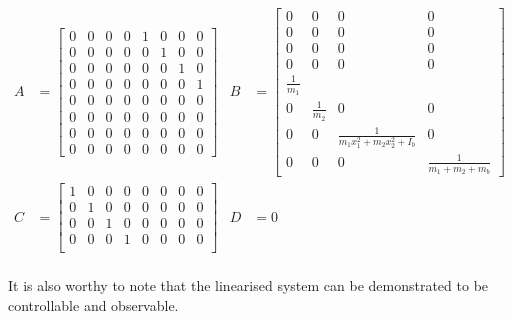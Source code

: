 \documentclass{UoNMCHA}
\numberwithin{equation}{section}
\begin{document}
\begin{align*}
A & = 
\begin{bmatrix}
0 & 0 & 0 & 0 & 1 & 0 & 0 & 0 \\
0 & 0 & 0 & 0 & 0 & 1 & 0 & 0 \\
0 & 0 & 0 & 0 & 0 & 0 & 1 & 0 \\
0 & 0 & 0 & 0 & 0 & 0 & 0 & 1 \\
0 & 0 & 0 & 0 & 0 & 0 & 0 & 0 \\
0 & 0 & 0 & 0 & 0 & 0 & 0 & 0 \\
0 & 0 & 0 & 0 & 0 & 0 & 0 & 0 \\
0 & 0 & 0 & 0 & 0 & 0 & 0 & 0
\end{bmatrix} & 
B & = 
\begin{bmatrix}
0 & 0 & 0 & 0 \\
0 & 0 & 0 & 0 \\
0 & 0 & 0 & 0 \\
0 & 0 & 0 & 0 \\
\frac{1}{m_{1}} & & & \\
0 & \frac{1}{m_{2}} & 0 & 0 \\
0 & 0 & \frac{1}{m_1 x_1^2 + m_2 x_2^2 + I_b} & 0 \\
0 & 0 & 0 & \frac{1}{m_1  + m_2  + m_b}
\end{bmatrix} \\
C & = 
\begin{bmatrix}
1 & 0 & 0 & 0 & 0 & 0 & 0 & 0 \\
0 & 1 & 0 & 0 & 0 & 0 & 0 & 0 \\
0 & 0 & 1 & 0 & 0 & 0 & 0 & 0 \\
0 & 0 & 0 & 1 & 0 & 0 & 0 & 0 \\
\end{bmatrix} & 
D & =0 \\
\end{align*}


It is also worthy to note that the linearised system can be demonstrated to be controllable and
observable.
\end{document}
